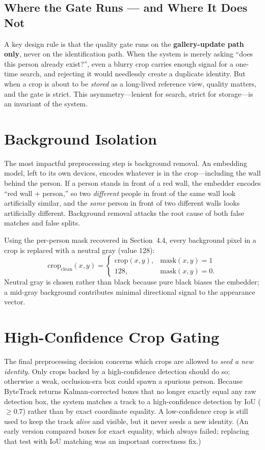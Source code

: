 \documentclass[12pt]{report}
\begin{document}
\subsection{Where the Gate Runs --- and Where It Does Not}
A key design rule is that the quality gate runs on the \textbf{gallery-update path only}, never on the identification path. When the system is merely asking ``does this person already exist?'', even a blurry crop carries enough signal for a one-time search, and rejecting it would needlessly create a duplicate identity. But when a crop is about to be \emph{stored} as a long-lived reference view, quality matters, and the gate is strict. This asymmetry---lenient for search, strict for storage---is an invariant of the system.

\section{Background Isolation}
The most impactful preprocessing step is background removal. An embedding model, left to its own devices, encodes whatever is in the crop---including the wall behind the person. If a person stands in front of a red wall, the embedder encodes ``red wall + person,'' so two \emph{different} people in front of the same wall look artificially similar, and the \emph{same} person in front of two different walls looks artificially different. Background removal attacks the root cause of both false matches and false splits.

Using the per-person mask recovered in Section~4.4, every background pixel in a crop is replaced with a neutral gray (value 128):
\[
\text{crop}_{\text{clean}}(x,y) =
\begin{cases}
\text{crop}(x,y), & \text{mask}(x,y) = 1 \\
128, & \text{mask}(x,y) = 0 .
\end{cases}
\]
Neutral gray is chosen rather than black because pure black biases the embedder; a mid-gray background contributes minimal directional signal to the appearance vector.

\section{High-Confidence Crop Gating}
The final preprocessing decision concerns which crops are allowed to \emph{seed a new identity}. Only crops backed by a high-confidence detection should do so; otherwise a weak, occlusion-era box could spawn a spurious person. Because ByteTrack returns Kalman-corrected boxes that no longer exactly equal any raw detection box, the system matches a track to a high-confidence detection by IoU ($\geq 0.7$) rather than by exact coordinate equality. A low-confidence crop is still used to keep the track \emph{alive} and visible, but it never seeds a new identity. (An early version compared boxes for exact equality, which always failed; replacing that test with IoU matching was an important correctness fix.)
\end{document}
